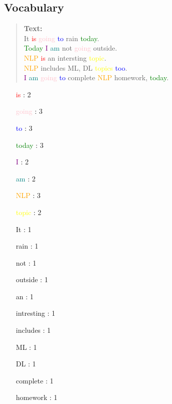 \subsection{Vocabulary}
\begin{quote}
\textbf{Text:} 					\\
	It \textcolor{red}{is} \textcolor{pink}{going} \textcolor{blue}{to} rain \textcolor{green}{today}. 			\\
	\textcolor{green}{Today} \textcolor{purple}{I} \textcolor{teal}{am} not \textcolor{pink}{going} outside.			\\
	\textcolor{orange}{NLP} \textcolor{red}{is} an intersting \textcolor{yellow}{topic}. 			\\
	\textcolor{orange}{NLP} includes ML, DL \textcolor{yellow}{topics} \textcolor{blue}{too}. 		\\
	\textcolor{purple}{I} \textcolor{teal}{am} \textcolor{pink}{going} \textcolor{blue}{to} complete \textcolor{orange}{NLP} homework, \textcolor{green}{today}. 	\\
\end{quote}
\begin{multicols}{3}
\begin{itemize}
	\item [\textcolor{red}{is}] : 2  
	\item [\textcolor{pink}{going}] : 3  
	\item [\textcolor{blue}{to}] : 3  
	\item [\textcolor{green}{today}] : 3  
	\item [\textcolor{purple}{I}] : 2  
	\item [\textcolor{teal}{am}] : 2  
		\columnbreak
\end{itemize}
\begin{itemize}
	\item [\textcolor{orange}{NLP}] : 3  
	\item [\textcolor{yellow}{topic}] : 2  
	\item [It] : 1
	\item [rain] : 1
	\item [not] : 1
	\item [outside] : 1
\end{itemize}
		\columnbreak
\begin{itemize}
	\item [an] : 1
	\item [intresting] : 1
	\item [includes] : 1
	\item [ML] : 1
	\item [DL] : 1
	\item [complete] : 1
	\item [homework] : 1
\end{itemize}
\end{multicols}

